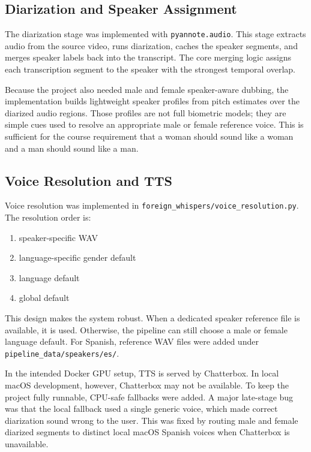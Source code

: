 \documentclass[11pt]{article}
\begin{document}
\subsection{Diarization and Speaker Assignment}
The diarization stage was implemented with \texttt{pyannote.audio}. This stage
extracts audio from the source video, runs diarization, caches the speaker
segments, and merges speaker labels back into the transcript. The core merging
logic assigns each transcription segment to the speaker with the strongest
temporal overlap.

Because the project also needed male and female speaker-aware dubbing, the
implementation builds lightweight speaker profiles from pitch estimates over
the diarized audio regions. Those profiles are not full biometric models; they
are simple cues used to resolve an appropriate male or female reference voice.
This is sufficient for the course requirement that a woman should sound like a
woman and a man should sound like a man.

\subsection{Voice Resolution and TTS}
Voice resolution was implemented in
\texttt{foreign\_whispers/voice\_resolution.py}. The resolution order is:
\begin{enumerate}[leftmargin=*]
\item speaker-specific WAV
\item language-specific gender default
\item language default
\item global default
\end{enumerate}

This design makes the system robust. When a dedicated speaker reference file is
available, it is used. Otherwise, the pipeline can still choose a male or
female language default. For Spanish, reference WAV files were added under
\texttt{pipeline\_data/speakers/es/}.

In the intended Docker GPU setup, TTS is served by Chatterbox. In local macOS
development, however, Chatterbox may not be available. To keep the project
fully runnable, CPU-safe fallbacks were added. A major late-stage bug was that
the local fallback used a single generic voice, which made correct diarization
sound wrong to the user. This was fixed by routing male and female diarized
segments to distinct local macOS Spanish voices when Chatterbox is unavailable.
\end{document}
